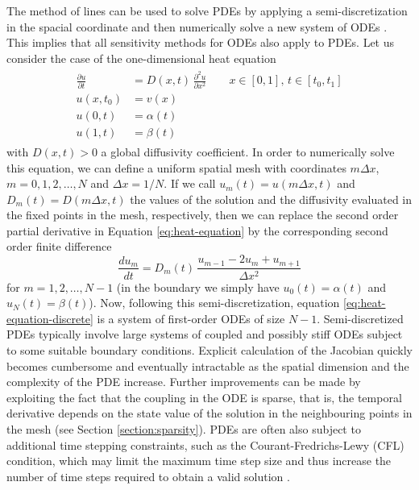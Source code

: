 The method of lines can be used to solve PDEs by applying a semi-discretization in the spacial coordinate and then numerically solve a new system of ODEs \cite{ascher2008numerical}. 
This implies that all sensitivity methods for ODEs also apply to PDEs. 
Let us consider the case of the one-dimensional heat equation
\begin{align}
\begin{split}
 \frac{\partial u}{\partial t}
 &= 
 D(x,t) \, 
 \frac{\partial^2 u}{\partial x^2} \qquad x \in [0,1], \, t \in [t_0, t_1]\\
 u(x, t_0) &= v(x) \\
 u(0, t) &= \alpha(t) \\
 u(1, t) &= \beta(t)
 \label{eq:heat-equation}
\end{split}
\end{align}
with $D(x, t) > 0$ a global diffusivity coefficient.
In order to numerically solve this equation, we can define a uniform spatial mesh with coordinates $m \Delta x$, $m=0, 1, 2, \ldots, N$ and $\Delta x = 1 / N$.
If we call $u_m(t) = u(m \Delta x, t)$ and $D_m(t) = D(m\Delta x, t)$ the values of the solution and the diffusivity evaluated in the fixed points in the mesh, respectively, then we can replace the second order partial derivative in Equation \eqref{eq:heat-equation} by the corresponding second order finite difference
\begin{equation}
 \frac{d u_m}{dt} 
 = 
 D_m(t) \, 
 \frac{u_{m-1} - 2u_m + u_{m+1}}{\Delta x^2}
 \label{eq:heat-equation-discrete}
\end{equation}
for $m = 1, 2, \ldots, N-1$ (in the boundary we simply have $u_0(t) = \alpha(t)$ and $u_N(t)=\beta(t)$).
Now, following this semi-discretization, equation \eqref{eq:heat-equation-discrete} is a system of first-order ODEs of size $N-1$.
Semi-discretized PDEs typically involve large systems of coupled and possibly stiff ODEs subject to some suitable boundary conditions. 
Explicit calculation of the Jacobian quickly becomes cumbersome and eventually intractable as the spatial dimension and the complexity of the PDE increase.
Further improvements can be made by exploiting the fact that the coupling in the ODE is sparse, that is, the temporal derivative depends on the state value of the solution in the neighbouring points in the mesh (see Section \ref{section:sparsity}).
PDEs are often also subject to additional time stepping constraints, such as the Courant-Fredrichs-Lewy (CFL) condition, which may limit the maximum time step size and thus increase the number of time steps required to obtain a valid solution \cite{courantPartialDifferenceEquations1967}. 

